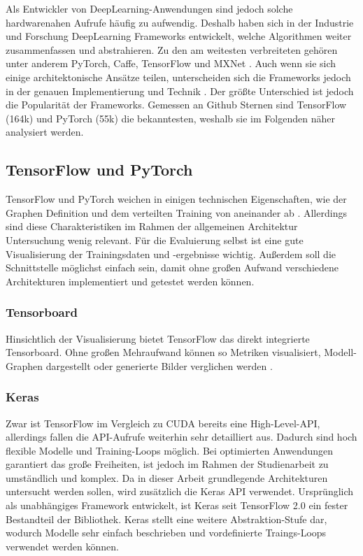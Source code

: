 Als Entwickler von DeepLearning-Anwendungen sind jedoch solche hardwarenahen Aufrufe häufig zu aufwendig.
Deshalb haben sich in der Industrie und Forschung DeepLearning Frameworks entwickelt, welche Algorithmen weiter zusammenfassen und abstrahieren.
Zu den am weitesten verbreiteten gehören unter anderem PyTorch, Caffe, TensorFlow und MXNet \cite[S. 2018]{dl-framework-evaluation}. 
Auch wenn sie sich einige architektonische Ansätze teilen, unterscheiden sich die Frameworks jedoch in der genauen Implementierung und Technik \cite[S. 2018, 2020]{dl-framework-evaluation}.
Der größte Unterschied ist jedoch die Popularität der Frameworks.
Gemessen an Github Sternen sind TensorFlow (164k) \cite{github-tensorflow} und PyTorch (55k) \cite{github-pytorch} die bekanntesten, weshalb sie im Folgenden näher analysiert werden.
 
\subsection{TensorFlow und PyTorch}
TensorFlow und PyTorch weichen in einigen technischen Eigenschaften, wie der Graphen Definition und dem verteilten Training von aneinander ab \cite{pytorch-vs-tensorflow}.
Allerdings sind diese Charakteristiken im Rahmen der allgemeinen Architektur Untersuchung wenig relevant.
Für die Evaluierung selbst ist eine gute Visualisierung der Trainingsdaten und -ergebnisse wichtig.
Außerdem soll die Schnittstelle möglichst einfach sein, damit ohne großen Aufwand verschiedene Architekturen implementiert und getestet werden können.

\subsubsection{Tensorboard}
Hinsichtlich der Visualisierung bietet TensorFlow das direkt integrierte Tensorboard.
Ohne großen Mehraufwand können so Metriken visualisiert, Modell-Graphen dargestellt oder generierte Bilder verglichen werden \cite{tensorboard}.

\subsubsection{Keras}
Zwar ist TensorFlow im Vergleich zu CUDA bereits eine High-Level-API, allerdings fallen die API-Aufrufe weiterhin sehr detailliert aus.
Dadurch sind hoch flexible Modelle und Training-Loops möglich.
Bei optimierten Anwendungen garantiert das große Freiheiten, ist jedoch im Rahmen der Studienarbeit zu umständlich und komplex.
Da in dieser Arbeit grundlegende Architekturen untersucht werden sollen, wird zusätzlich die Keras API \cite{keras} verwendet.
Ursprünglich als unabhängiges Framework entwickelt, ist Keras seit TensorFlow 2.0 ein fester Bestandteil der Bibliothek.
Keras stellt eine weitere Abstraktion-Stufe dar, wodurch Modelle sehr einfach beschrieben und vordefinierte Traings-Loops verwendet werden können.
\newline

